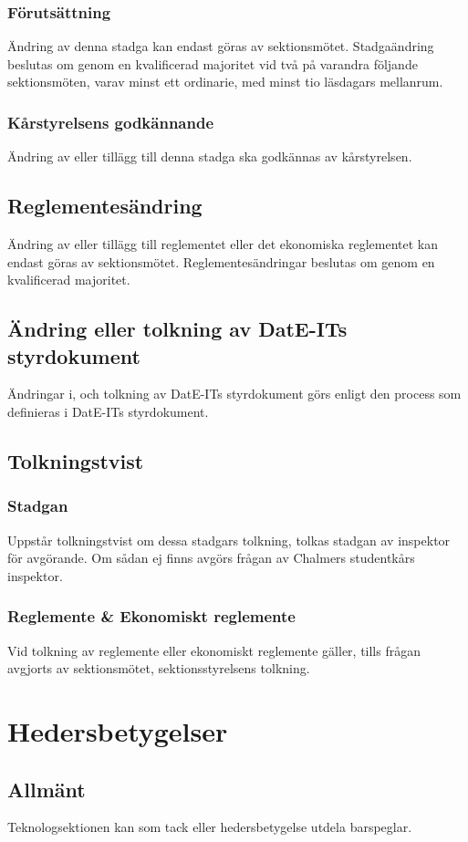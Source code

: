 \documentclass[a4paper]{dtek}
\begin{document}
\subsubsection{Förutsättning}
Ändring av denna stadga kan endast göras av sektionsmötet. 
Stadgaändring beslutas om genom en kvalificerad majoritet vid två på varandra följande sektionsmöten, varav minst ett ordinarie, med minst tio läsdagars mellanrum.
\subsubsection{Kårstyrelsens godkännande}
Ändring av eller tillägg till denna stadga ska godkännas av kårstyrelsen.
\subsection{Reglementesändring}
Ändring av eller tillägg till reglementet eller det ekonomiska reglementet kan endast göras av sektionsmötet. 
Reglementesändringar beslutas om genom en kvalificerad majoritet.
\subsection{Ändring eller tolkning av DatE-ITs styrdokument}
Ändringar i, och tolkning av DatE-ITs styrdokument görs enligt den process som definieras i DatE-ITs styrdokument.
\subsection{Tolkningstvist}
\subsubsection{Stadgan}
Uppstår tolkningstvist om dessa stadgars tolkning, tolkas stadgan av inspektor för avgörande. Om sådan ej finns avgörs frågan av Chalmers studentkårs inspektor.
\subsubsection{Reglemente \& Ekonomiskt reglemente}
Vid tolkning av reglemente eller ekonomiskt reglemente gäller, tills frågan avgjorts av sektionsmötet, sektionsstyrelsens tolkning.
\newpage


\section{Hedersbetygelser}
\subsection{Allmänt}
Teknologsektionen kan som tack eller hedersbetygelse utdela barspeglar.
\end{document}
